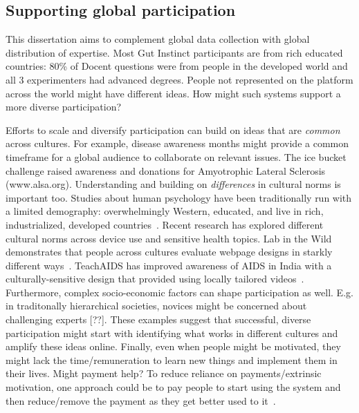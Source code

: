 \subsection{Supporting global participation}
This dissertation aims to complement global data collection with global distribution of expertise. Most Gut Instinct participants are from rich educated countries: 80\% of Docent questions were from people in the developed world and all 3 experimenters had advanced degrees. People not represented on the platform across the world might have different ideas. How might such systems support a more diverse participation?

Efforts to scale and diversify participation can build on ideas that are \textit{common} across cultures. For example, disease awareness months might provide a common timeframe for a global audience to collaborate on relevant issues. The ice bucket challenge raised awareness and donations for Amyotrophic Lateral Sclerosis (www.alsa.org). Understanding and building on \textit{differences} in cultural norms is important too. Studies about human psychology have been traditionally run with a limited demography: overwhelmingly Western, educated, and live in rich, industrialized, developed countries~\cite{Henrich2010a}. Recent research has explored different cultural norms across device use and sensitive health topics. Lab in the Wild demonstrates that people across cultures evaluate webpage designs in starkly different ways~\cite{Reinecke2014a}. TeachAIDS has improved awareness of AIDS in India with a culturally-sensitive design that provided using locally tailored videos~\cite{sorcar2009teaching}. Furthermore, complex socio-economic factors can shape participation as well. E.g. in traditonally hierarchical societies, novices might be concerned about challenging experts [??]. These examples suggest that successful, diverse participation might start with identifying what works in different cultures and amplify these ideas online. Finally, even when people might be motivated, they might lack the time/remuneration to learn new things and implement them in their lives. Might payment help? To reduce reliance on payments/extrinsic motivation, one approach could be to pay people to start using the system and then reduce/remove the payment as they get better used to it~\cite{Resnick2011}. 



